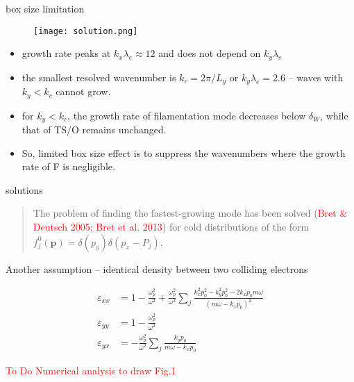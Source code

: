 \documentclass[10pt]{beamer}
\begin{document}
\begin{frame}{box size limitation}
  \begin{figure}
    \texttt{[image: solution.png]}
  \end{figure}
  \begin{itemize}
  \item growth rate peaks at $k_x\lambda_e \approx 12$ and does not depend on $k_y\lambda_e$
  \item the smallest resolved wavenumber is $k_c = 2\pi/L_y$ or $k_y\lambda_e=2.6$ -- waves with $k_y < k_c$ cannot grow.
  \item for $k_y < k_c$, the growth rate of filamentation mode decreases below $\delta_{W}$, while that of TS/O remains unchanged.
  \item So, limited box size effect is to suppress the wavenumbers where the growth rate of F is negligible.
  \end{itemize}
\end{frame}

\begin{frame}{solutions}

  \begin{quote}
    The problem of finding the fastest-growing mode has been solved (\textcolor{red}{Bret \& Deutsch 2005; Bret et al. 2013}) for cold distributions of the form $f_j^0(\bm{p}) = \delta(p_y)\delta(p_x-P_j)$.
  \end{quote}
  
  Another assumption -- identical density between two colliding electrons
  
  \begin{equation*}
      \begin{aligned}
        \varepsilon_{xx} & = 1-\frac{\omega_p^2}{\omega^2} + \frac{\omega_p^2}{\omega^2}\sum_j \frac{k_x^2p_0^2-k_y^2p_0^2-2k_xp_0m\omega}{(m\omega-k_xp_0)^2} \\
        \varepsilon_{yy} & = 1-\frac{\omega_p^2}{\omega^2} \\
        \varepsilon_{yx} & = -\frac{\omega_p^2}{\omega^2}\sum_j\frac{k_yp_0}{m\omega-k_xp_0}
      \end{aligned}
  \end{equation*}
  
  \textcolor{red}{To Do Numerical analysis to draw Fig.1}
  
  

\end{frame}
\end{document}
